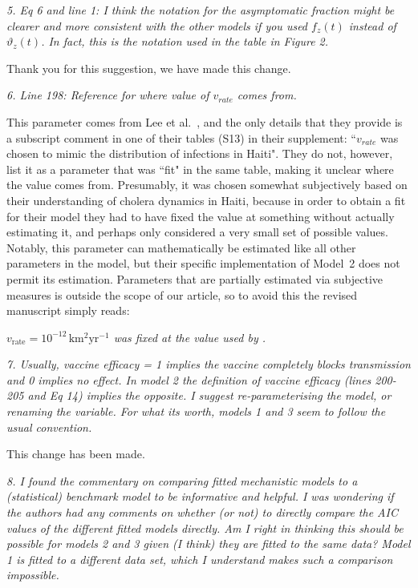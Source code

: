 \documentclass[11pt]{article}
\newcommand\report[1]{{\color{mygreen} \vspace{1mm}\hspace{0.25in}\parbox{6in}{\em #1}}}
\newcommand\article[1]{{\color{blue} \vspace{1mm}\hspace{0.25in}\parbox{6in}{\em #1}}}
\begin{document}
\report{5.
  Eq 6 and line 1: I think the notation for the asymptomatic fraction might be clearer and more consistent with the other models if you used $f_z(t)$ instead of $\vartheta_z(t)$. In fact, this is the notation used in the table in Figure 2.
}

Thank you for this suggestion, we have made this change.

\report{6.
  Line 198: Reference for where value of $v_{rate}$ comes from.
}

This parameter comes from Lee et al.~\cite{lee20}, and the only details that they provide is a subscript comment in one of their tables (S13) in their supplement: ``$v_{rate}$ was chosen to mimic the distribution of infections in Haiti". 
They do not, however, list it as a parameter that was ``fit" in the same table, making it unclear where the value comes from. 
Presumably, it was chosen somewhat subjectively based on their understanding of cholera dynamics in Haiti, because in order to obtain a fit for their model they had to have fixed the value at something without actually estimating it, and perhaps only considered a very small set of possible values. Notably, this parameter can mathematically be estimated like all other parameters in the model, but their specific implementation of Model~2 does not permit its estimation. 
Parameters that are partially estimated via subjective measures is outside the scope of our article, so to avoid this the revised manuscript simply reads: 

\article{$v_{\mathrm{rate}}= 10^{-12} \,\mbox{km$^2$yr$^{-1}$}$ was fixed at the value used by \cite{lee20}.}

\report{7.
  Usually, vaccine efficacy = 1 implies the vaccine completely blocks transmission and 0 implies no effect. In model 2 the definition of vaccine efficacy (lines 200-205 and Eq 14) implies the opposite. I suggest re-parameterising the model, or renaming the variable. For what its worth, models 1 and 3 seem to follow the usual convention.
}

This change has been made. 

\report{8.
  I found the commentary on comparing fitted mechanistic models to a (statistical) benchmark model to be informative and helpful. I was wondering if the authors had any comments on whether (or not) to directly compare the AIC values of the different fitted models directly. Am I right in thinking this should be possible for models 2 and 3 given (I think) they are fitted to the same data? Model 1 is fitted to a different data set, which I understand makes such a comparison impossible.
}
\end{document}
